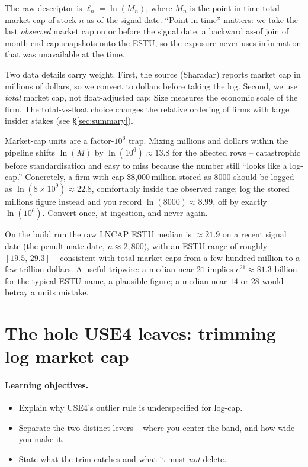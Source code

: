 \documentclass[11pt]{article}
\theoremstyle{definition}
\theoremstyle{plain}
\theoremstyle{remark}
\begin{document}
The raw descriptor is $\ell_n = \ln(M_n)$, where $M_n$ is the point-in-time total market cap of stock $n$ as of the signal date. ``Point-in-time'' matters: we take the last \emph{observed} market cap on or before the signal date, a backward as-of join of month-end cap snapshots onto the ESTU, so the exposure never uses information that was unavailable at the time.

Two data details carry weight. First, the source (Sharadar) reports market cap in millions of dollars, so we convert to dollars before taking the log. Second, we use \emph{total} market cap, not float-adjusted cap: Size measures the economic scale of the firm. The total-vs-float choice changes the relative ordering of firms with large insider stakes (see \S\ref{sec:summary}).

\begin{pitfall}
Market-cap units are a factor-$10^6$ trap. Mixing millions and dollars within the pipeline shifts $\ln(M)$ by $\ln(10^6)\approx 13.8$ for the affected rows -- catastrophic before standardisation and easy to miss because the number still ``looks like a log-cap.'' Concretely, a firm with cap \$8{,}000\,million stored as $8000$ should be logged as $\ln(8\times10^9)\approx 22.8$, comfortably inside the observed range; log the stored millions figure instead and you record $\ln(8000)\approx 8.99$, off by exactly $\ln(10^6)$. Convert once, at ingestion, and never again.
\end{pitfall}

\begin{observed}
On the build run the raw LNCAP ESTU median is $\approx 21.9$ on a recent signal date (the penultimate date, $n\approx2{,}800$), with an ESTU range of roughly $[19.5,\,29.3]$ -- consistent with total market caps from a few hundred million to a few trillion dollars. A useful tripwire: a median near $21$ implies $e^{21}\approx \$1.3$ billion for the typical ESTU name, a plausible figure; a median near $14$ or $28$ would betray a units mistake.
\end{observed}

\section{The hole USE4 leaves: trimming log market cap}\label{sec:trim}

\paragraph{Learning objectives.}
\begin{itemize}[leftmargin=1.4em,topsep=2pt,itemsep=1pt]
  \item Explain why USE4's outlier rule is underspecified for log-cap.
  \item Separate the two distinct levers -- where you center the band, and how wide you make it.
  \item State what the trim catches and what it must \emph{not} delete.
\end{itemize}
\end{document}
